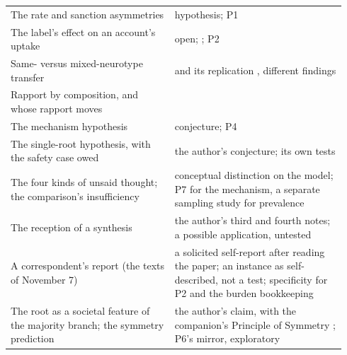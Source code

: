 \begin{center}
\begin{tabular}{p{0.46\linewidth} p{0.48\linewidth}}
The rate and sanction asymmetries & hypothesis; P1 \\
The label's effect on an account's uptake & open; \cite{Sasson2017, SassonMorrison2019}; P2 \\
Same- versus mixed-neurotype transfer & \cite{Crompton2020} and its replication \cite{Crompton2025}, different findings \\
Rapport by composition, and whose rapport moves & \cite{Foster2025} \\
The mechanism hypothesis & conjecture; P4 \\
The single-root hypothesis, with the safety case owed & the author's conjecture; its own tests \\
The four kinds of unsaid thought; the comparison's insufficiency & conceptual distinction on the model; P7 for the mechanism, a separate sampling study for prevalence \\
The reception of a synthesis & the author's third and fourth notes; a possible application, untested \\
A correspondent's report (the texts of November 7) & a solicited self-report after reading the paper; an instance as self-described, not a test; specificity for P2 and the burden bookkeeping \\
The root as a societal feature of the majority branch; the symmetry prediction & the author's claim, with the companion's Principle of Symmetry \cite{NormCost}; P6's mirror, exploratory \\
\bottomrule
\end{tabular}
\end{center}

